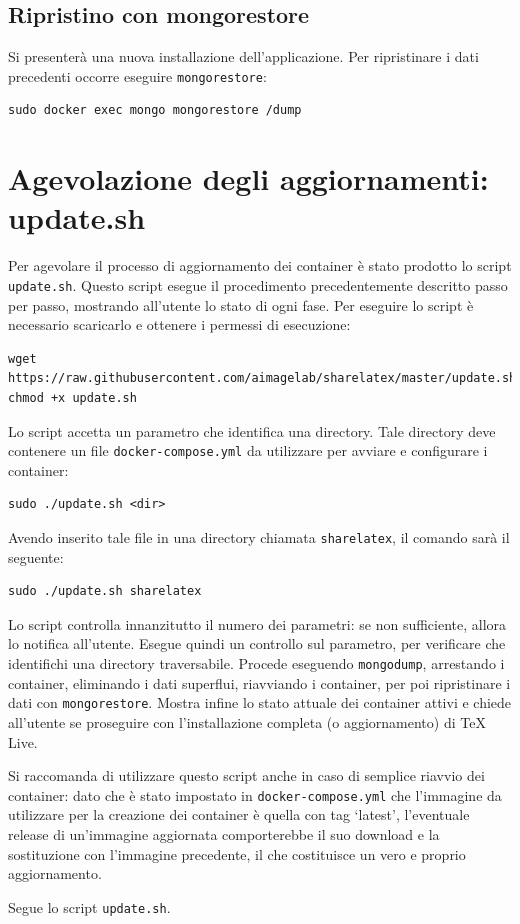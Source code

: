 \subsection{Ripristino con mongorestore}
Si presenterà una nuova installazione dell'applicazione. Per ripristinare i dati precedenti occorre eseguire \verb|mongorestore|:
\begin{lstlisting}
sudo docker exec mongo mongorestore /dump
\end{lstlisting}

\section{Agevolazione degli aggiornamenti: update.sh}
Per agevolare il processo di aggiornamento dei container è stato prodotto lo script\\\verb|update.sh|. Questo script esegue il procedimento precedentemente descritto passo per passo, mostrando all'utente lo stato di ogni fase. Per eseguire lo script è necessario scaricarlo e ottenere i permessi di esecuzione:
\begin{lstlisting}
wget https://raw.githubusercontent.com/aimagelab/sharelatex/master/update.sh
chmod +x update.sh
\end{lstlisting}
Lo script accetta un parametro che identifica una directory. Tale directory deve contenere un file \verb|docker-compose.yml| da utilizzare per avviare e configurare i container:
\begin{lstlisting}
sudo ./update.sh <dir>
\end{lstlisting}
Avendo inserito tale file in una directory chiamata \verb|sharelatex|, il comando sarà il seguente:
\begin{lstlisting}
sudo ./update.sh sharelatex
\end{lstlisting}
Lo script controlla innanzitutto il numero dei parametri: se non sufficiente, allora lo notifica all'utente. Esegue quindi un controllo sul parametro, per verificare che identifichi una directory traversabile. Procede eseguendo \verb|mongodump|, arrestando i container, eliminando i dati superflui, riavviando i container, per poi ripristinare i dati con \verb|mongorestore|. Mostra infine lo stato attuale dei container attivi e chiede all'utente se proseguire con l'installazione completa (o aggiornamento) di TeX Live.

Si raccomanda di utilizzare questo script anche in caso di semplice riavvio dei container: dato che è stato impostato in \verb|docker-compose.yml| che l'immagine da utilizzare per la creazione dei container è quella con tag \enquote*{latest}, l'eventuale release di un'immagine aggiornata comporterebbe il suo download e la sostituzione con l'immagine precedente, il che costituisce un vero e proprio aggiornamento.

Segue lo script \verb|update.sh|.

